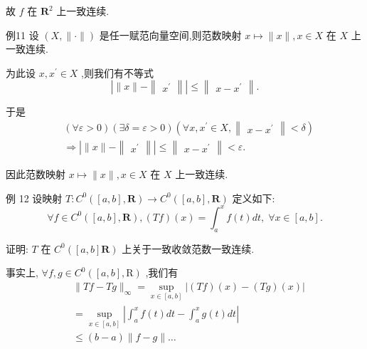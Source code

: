 故 $f$ 在 ${\mathbf{R}}^{2}$ 上一致连续.

例11 设 $\left( {X,\parallel  \cdot  \parallel }\right)$ 是任一赋范向量空间,则范数映射 $x \mapsto  \parallel x\parallel ,x \in  X$ 在 $X$ 上一致连续.

为此设 $x,{x}^{\prime } \in  X$ ,则我们有不等式
$$\left| {\parallel x\parallel  - \begin{Vmatrix}{x}^{\prime }\end{Vmatrix}}\right|  \leq  \begin{Vmatrix}{x - {x}^{\prime }}\end{Vmatrix}.$$

于是
\begin{align*}
	&\left( {\forall \varepsilon  > 0}\right) \left( {\exists \delta  = \varepsilon  > 0}\right) \left( {\forall x,{x}^{\prime } \in  X,\begin{Vmatrix}{x - {x}^{\prime }}\end{Vmatrix} < \delta }\right)\\
	&\Rightarrow  \left| {\parallel x\parallel  - \begin{Vmatrix}{x}^{\prime }\end{Vmatrix}}\right|  \leq  \begin{Vmatrix}{x - {x}^{\prime }}\end{Vmatrix} < \varepsilon .
\end{align*}

因此范数映射 $x \mapsto  \parallel x\parallel ,x \in  X$ 在 $X$ 上一致连续.

例 12 设映射 $T : {C}^{0}\left( {\left\lbrack  {a,b}\right\rbrack  ,\mathbf{R}}\right)  \rightarrow  {C}^{0}\left( {\left\lbrack  {a,b}\right\rbrack  ,\mathbf{R}}\right)$ 定义如下:
$$\forall f \in  {C}^{0}\left( {\left\lbrack  {a,b}\right\rbrack  ,\mathbf{R}}\right) ,\left( {Tf}\right) \left( x\right)  = {\int }_{a}^{x}f\left( t\right) {dt},\;\forall x \in  \left\lbrack  {a,b}\right\rbrack  .$$

证明: $T$ 在 ${C}^{0}\left( {\left\lbrack  {a,b}\right\rbrack  \mathbf{R}}\right)$ 上关于一致收敛范数一致连续.

事实上, $\forall f,g \in  {C}^{0}\left( {\left\lbrack  {a,b}\right\rbrack  ,\mathrm{R}}\right)$ ,我们有
\begin{align*}
	&\parallel {Tf} - {Tg}{\parallel }_{\infty } = \mathop{\sup }\limits_{{x \in  \left\lbrack  {a,b}\right\rbrack  }}\left| {\left( {Tf}\right) \left( x\right)  - \left( {Tg}\right) \left( x\right) }\right|\\
	&= \mathop{\sup }\limits_{{x \in  \left\lbrack  {a,b}\right\rbrack  }}\left| {{\int }_{a}^{x}f\left( t\right) {dt} - {\int }_{a}^{x}g\left( t\right) {dt}}\right|\\
	&\leq  \left( {b - a}\right) \parallel f - g\parallel \ldots
\end{align*}

